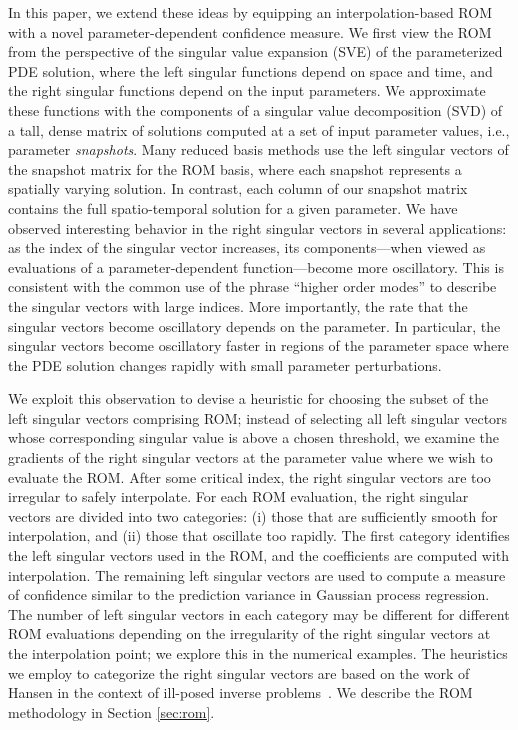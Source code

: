 \documentclass[final]{siamltex}
\begin{document}
In this paper, we extend these ideas by equipping an
interpolation-based ROM with a novel parameter-dependent confidence
measure. We first view the ROM from the perspective of the singular
value expansion (SVE) of the parameterized PDE solution, where the
left singular functions depend on space and time, and the right
singular functions depend on the input parameters.  We approximate
these functions with the components of a singular value decomposition
(SVD) of a tall, dense matrix of solutions computed at a set of input
parameter values, i.e., parameter \emph{snapshots}. Many reduced basis
methods use the left singular vectors of the snapshot matrix for the
ROM basis, where each snapshot represents a spatially varying
solution.  In contrast, each column of our snapshot matrix contains
the full spatio-temporal solution for a given parameter.  We have
observed interesting behavior in the right singular vectors in several
applications: as the index of the singular vector increases, its
components---when viewed as evaluations of a parameter-dependent
function---become more oscillatory. This is consistent with the common
use of the phrase ``higher order modes'' to describe the singular
vectors with large indices. More importantly, the rate that the
singular vectors become oscillatory depends on the parameter. In
particular, the singular vectors become oscillatory faster in regions
of the parameter space where the PDE solution changes rapidly with
small parameter perturbations.

We exploit this observation to devise a heuristic for choosing the
subset of the left singular vectors comprising ROM; instead of
selecting all left singular vectors whose corresponding singular value
is above a chosen threshold, we examine the gradients of the right
singular vectors at the parameter value where we wish to evaluate the
ROM.  After some critical index, the right singular vectors are too
irregular to safely interpolate.  For each ROM evaluation, the right
singular vectors are divided into two categories: (i) those that are
sufficiently smooth for interpolation, and (ii) those that oscillate
too rapidly. The first category identifies the left singular vectors
used in the ROM, and the coefficients are computed with interpolation.
The remaining left singular vectors are used to compute a measure of
confidence similar to the prediction variance in Gaussian process
regression. The number of left singular vectors in each category may
be different for different ROM evaluations depending on the
irregularity of the right singular vectors at the interpolation point;
we explore this in the numerical examples.  The heuristics we employ
to categorize the right singular vectors are based on the work of
Hansen in the context of ill-posed inverse problems~\cite{Hansen2010}. We 
describe the ROM methodology in Section \ref{sec:rom}. 
\end{document}
